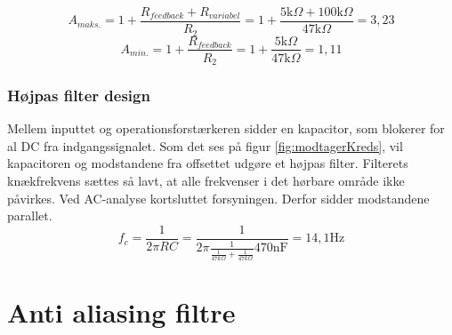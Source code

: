 \begin{equation}
\label{eq:Aminfors}
A_{maks.} = 1 + \frac{R_{feedback} + R_{variabel}}{R_2} = 1 + \frac{5\text{k} \Omega + 100\text{k} \Omega}{47\text{k} \Omega} = 3,23
\end{equation}
\begin{equation}
\label{Amaksfors}
A_{min.} = 1 + \frac{R_{feedback}}{R_2} = 1 + \frac{5\text{k} \Omega}{47\text{k} \Omega} = 1,11
\end{equation}

\subsubsection{Højpas filter design}
Mellem inputtet og operationsforstærkeren sidder en kapacitor, som blokerer for al DC fra indgangssignalet. 
Som det ses på figur \ref{fig:modtagerKreds}, vil kapacitoren og modstandene fra offsettet udgøre et højpas filter. 
Filterets knækfrekvens sættes så lavt, at alle frekvenser i det hørbare område ikke påvirkes. 
Ved AC-analyse kortsluttet forsyningen. Derfor sidder modstandene parallet.
\begin{equation}
f_c = \frac{1}{2\pi R C} = \frac{1}{2 \pi \frac{1}{\frac{1}{47k \Omega}+\frac{1}{47k \Omega}}  470\text{nF}} = 14,1\text{Hz}
\end{equation}

\section{Anti aliasing filtre}